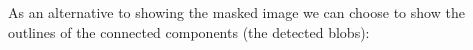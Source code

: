 As an alternative to showing the masked image we can choose to show the outlines of the connected components (the detected blobs):